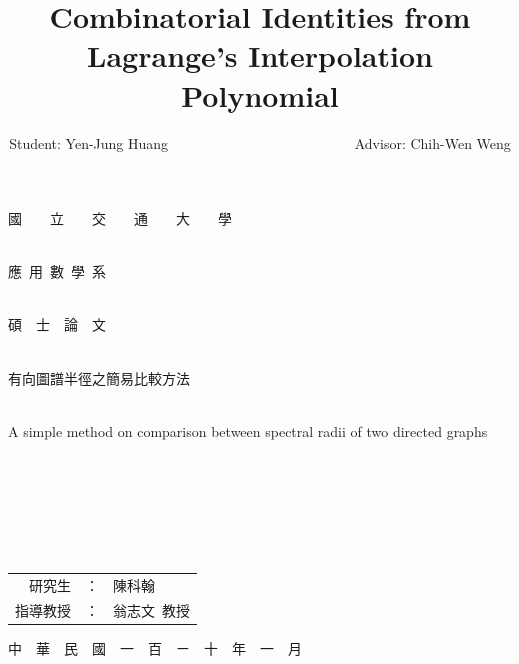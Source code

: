 \documentclass[12pt, a4paper]{article}
\title{Combinatorial Identities from Lagrange's Interpolation Polynomial}
\author{Student: Yen-Jung Huang  ~~~~~~~~~~~~~~~~~~~~~~~~~~Advisor: Chih-Wen Weng}
\date{} %
\theoremstyle{plain}
\theoremstyle{definition}
\begin{document}

\thispagestyle{empty}
\begin{center}
{ \Huge 國~~~~立~~~~交~~~~通~~~~大~~~~學}~\\~\\

\bigskip

{ \Huge 應~用~數~學~系}~\\~\\

\bigskip

{ \Huge 碩~~士~~論~~文}~\\~\\

\bigskip \bigskip\bigskip\bigskip\bigskip\bigskip

{ \Huge 有向圖譜半徑之簡易比較方法}~\\~\\

\bigskip

{ \Huge A simple method on comparison between spectral radii of two directed graphs}~\\~\\
~\\~\\~\\~\\~\\
\bigskip \bigskip\bigskip\bigskip\bigskip\bigskip
\bigskip \bigskip\bigskip\bigskip\bigskip\bigskip
\bigskip\bigskip\bigskip

{ \Large
\begin{tabular}{rcl}
研究生&：&陳科翰\\
指導教授&：&翁志文~教授
\end{tabular} }

\bigskip\bigskip
{ \Large 中~~華~~民~~國~~一~~百~~ㄧ~~十~~年~~一~~月 }
\large
\end{center}
\pagebreak
\end{document}
